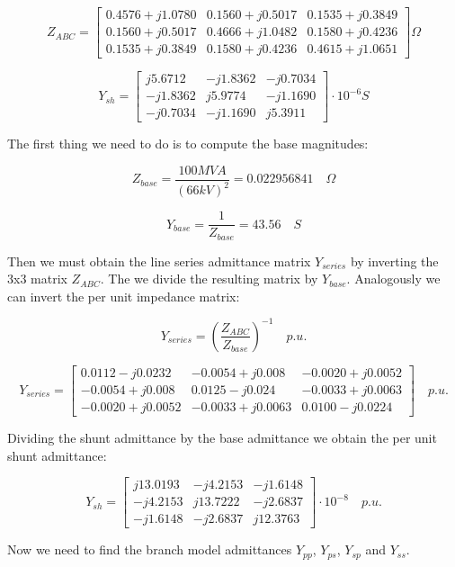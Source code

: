 \documentclass[a4paper,twoside,fleqn]{tufte-book}
\begin{document}
$$
Z_{ABC} = \left[ \begin{array}{ccc}
0.4576 + j 1.0780 & 0.1560 + j0 .5017 & 0.1535 + j 0.3849 \\
0.1560 + j 0.5017 & 0.4666 + j 1.0482 & 0.1580 + j 0.4236 \\ 
0.1535 + j 0.3849 & 0.1580 + j 0.4236 & 0.4615 + j 1.0651
\end{array} \right] \Omega
$$

$$
Y_{sh} = \left[ \begin{array}{ccc}
j5.6712 & -j1.8362 & -j0.7034 \\
-j1.8362 & j5.9774 & -j1.1690 \\ 
-j0.7034 & -j1.1690 & j5.3911
\end{array} \right] \cdot 10^{-6}  S
$$

The first thing we need to do is to compute the base magnitudes:

$$
Z_{base} = \frac{100 MVA}{(66kV)^2} = 0.022956841 \quad \Omega
$$

$$
Y_{base} = \frac{1}{Z_{base}} = 43.56 \quad S
$$

Then we must obtain the line series admittance matrix $Y_{series}$ by inverting the 3x3 matrix $Z_{ABC}$. The we divide the resulting matrix by $Y_{base}$. Analogously we can invert the per unit impedance matrix:

$$
Y_{series} = \left(\frac{Z_{ABC}}{Z_{base}}\right)^{-1} \quad p.u.
$$

$$
Y_{series} = \left[ \begin{array}{ccc}
0.0112-j0.0232  & -0.0054+j0.008   & -0.0020+j0.0052 \\ -0.0054+j0.008  &  0.0125-j0.024 & -0.0033+j0.0063 \\ -0.0020+j0.0052 &  -0.0033+j0.0063 & 0.0100-j0.0224
\end{array} \right]\quad  p.u.
$$

Dividing the shunt admittance by the base admittance we obtain the per unit shunt admittance:

$$
Y_{sh} = \left[ \begin{array}{ccc}
j13.0193 & -j4.2153 &  -j1.6148 \\
-j4.2153 & j13.7222 & -j2.6837 \\ 
-j1.6148 & -j2.6837 & j12.3763
\end{array} \right] \cdot 10^{-8}  \quad p.u.
$$

Now we need to find the branch model admittances $Y_{pp}$, $Y_{ps}$, $Y_{sp}$ and $Y_{ss}$.
\end{document}
